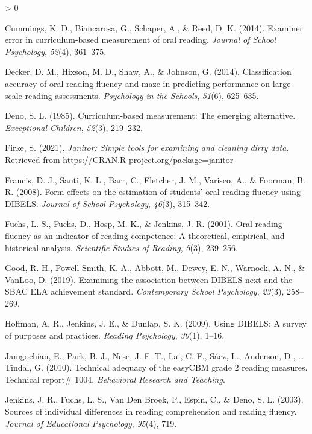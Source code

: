 \documentclass[
  english,
  man, fleqn, noextraspace]{apa6}
\newlength{\cslhangindent}
\newenvironment{CSLReferences}[2] %
 {%
  \setlength{\parindent}{0pt}
  \ifodd #1 \everypar{\setlength{\hangindent}{\cslhangindent}}\ignorespaces\fi
  \ifnum #2 > 0
  \setlength{\parskip}{#2\baselineskip}
  \fi
 }%
 {}
\begin{document}
\begin{CSLReferences}{1}{0}
\leavevmode\hypertarget{ref-cummings2014}{}%
Cummings, K. D., Biancarosa, G., Schaper, A., \& Reed, D. K. (2014). Examiner error in curriculum-based measurement of oral reading. \emph{Journal of School Psychology}, \emph{52}(4), 361--375.

\leavevmode\hypertarget{ref-decker2014}{}%
Decker, D. M., Hixson, M. D., Shaw, A., \& Johnson, G. (2014). Classification accuracy of oral reading fluency and maze in predicting performance on large-scale reading assessments. \emph{Psychology in the Schools}, \emph{51}(6), 625--635.

\leavevmode\hypertarget{ref-deno1985}{}%
Deno, S. L. (1985). Curriculum-based measurement: The emerging alternative. \emph{Exceptional Children}, \emph{52}(3), 219--232.

\leavevmode\hypertarget{ref-R-janitor}{}%
Firke, S. (2021). \emph{Janitor: Simple tools for examining and cleaning dirty data}. Retrieved from \url{https://CRAN.R-project.org/package=janitor}

\leavevmode\hypertarget{ref-francis2008}{}%
Francis, D. J., Santi, K. L., Barr, C., Fletcher, J. M., Varisco, A., \& Foorman, B. R. (2008). Form effects on the estimation of students' oral reading fluency using DIBELS. \emph{Journal of School Psychology}, \emph{46}(3), 315--342.

\leavevmode\hypertarget{ref-fuchs2001}{}%
Fuchs, L. S., Fuchs, D., Hosp, M. K., \& Jenkins, J. R. (2001). Oral reading fluency as an indicator of reading competence: A theoretical, empirical, and historical analysis. \emph{Scientific Studies of Reading}, \emph{5}(3), 239--256.

\leavevmode\hypertarget{ref-good2019}{}%
Good, R. H., Powell-Smith, K. A., Abbott, M., Dewey, E. N., Warnock, A. N., \& VanLoo, D. (2019). Examining the association between DIBELS next{{}} and the SBAC ELA achievement standard. \emph{Contemporary School Psychology}, \emph{23}(3), 258--269.

\leavevmode\hypertarget{ref-hoffman2009}{}%
Hoffman, A. R., Jenkins, J. E., \& Dunlap, S. K. (2009). Using DIBELS: A survey of purposes and practices. \emph{Reading Psychology}, \emph{30}(1), 1--16.

\leavevmode\hypertarget{ref-jamgochian2010tech}{}%
Jamgochian, E., Park, B. J., Nese, J. F. T., Lai, C.-F., Sáez, L., Anderson, D., \ldots{} Tindal, G. (2010). Technical adequacy of the easyCBM grade 2 reading measures. Technical report\# 1004. \emph{Behavioral Research and Teaching}.

\leavevmode\hypertarget{ref-jenkins2003}{}%
Jenkins, J. R., Fuchs, L. S., Van Den Broek, P., Espin, C., \& Deno, S. L. (2003). Sources of individual differences in reading comprehension and reading fluency. \emph{Journal of Educational Psychology}, \emph{95}(4), 719.


\end{CSLReferences}
\end{document}
